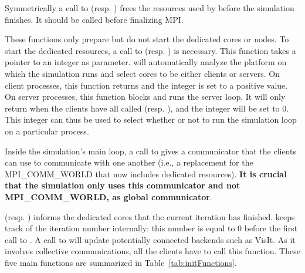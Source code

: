 Symmetrically a call
to  (resp. ) frees the resources used by
\Damaris{} before the simulation finishes. It should be called before finalizing MPI.

These functions only prepare \Damaris{} but do not start the dedicated cores or nodes.
To start the dedicated resources, a call to  (resp. )
is necessary. This function takes a pointer to an integer as parameter. \Damaris{} will automatically
analyze the platform on which the simulation runs and select cores to be either clients or servers.
On client processes, this function returns and the integer is set to a positive value. On server processes,
this function blocks and runs the server loop. It will only return when the clients have all called 
 (resp. ), and the integer will be set to 0.
This integer can thus be used to select whether or not to run the simulation loop on a particular process.

Inside the simulation's main loop, a call to 
 gives a
communicator that the clients can use to communicate with one another (i.e., a replacement for
the MPI\_COMM\_WORLD that now includes dedicated resources). \textbf{It is crucial that the
simulation only uses this communicator and not MPI\_COMM\_WORLD, as global communicator}. 

(resp. ) informs the dedicated cores that the current iteration 
has finished. \Damaris{} keeps track of the iteration number internally: 
this number is equal to 0 before the first call to .
A call to  will update potentially connected backends such as VisIt.
As it involves collective communications, all the clients have to call this function.
These five main functions are summarized in Table~\ref{tab:initFunctions}.

